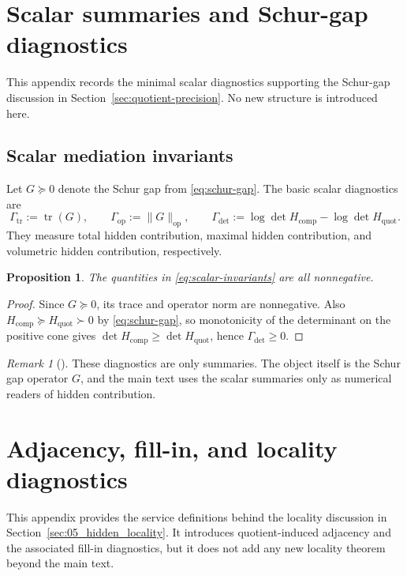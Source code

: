 \documentclass[11pt]{article}
\numberwithin{equation}{section}
\theoremstyle{thmcompact}
\newtheorem{proposition}[theorem]{Proposition}
\theoremstyle{remark}
\newtheorem*{remarkplain}{Remark}
\newenvironment{remark}[1][]%
{\begin{remarkbox}\begin{remarkplain}[#1]\normalfont}
		{\end{remarkplain}\end{remarkbox}}
\begin{document}
\section{Scalar summaries and Schur-gap diagnostics}\label{app:scalar}

This appendix records the minimal scalar diagnostics supporting the Schur-gap discussion in Section~\ref{sec:quotient-precision}. No new structure is introduced here.

\subsection{Scalar mediation invariants}

Let $G\succeq0$ denote the Schur gap from \eqref{eq:schur-gap}. The basic scalar diagnostics are
\begin{equation}\label{eq:scalar-invariants}
\Gamma_{\mathrm{tr}}:=\operatorname{tr}(G),
\qquad
\Gamma_{\mathrm{op}}:=\|G\|_{\mathrm{op}},
\qquad
\Gamma_{\det}:=\log\det H_{\mathrm{comp}}-\log\det H_{\mathrm{quot}}.
\end{equation}
They measure total hidden contribution, maximal hidden contribution, and volumetric hidden contribution, respectively.

\begin{proposition}\label{prop:scalar-invariants}
The quantities in \eqref{eq:scalar-invariants} are all nonnegative.
\end{proposition}

\begin{proof}
Since $G\succeq0$, its trace and operator norm are nonnegative. Also $H_{\mathrm{comp}}\succeq H_{\mathrm{quot}}\succ0$ by \eqref{eq:schur-gap}, so monotonicity of the determinant on the positive cone gives $\det H_{\mathrm{comp}}\ge \det H_{\mathrm{quot}}$, hence $\Gamma_{\det}\ge0$.
\end{proof}

\begin{remark}
These diagnostics are only summaries. The object itself is the Schur gap operator $G$, and the main text uses the scalar summaries only as numerical readers of hidden contribution.
\end{remark}

\section{Adjacency, fill-in, and locality diagnostics}\label{app:adjacency}

This appendix provides the service definitions behind the locality discussion in Section~\ref{sec:05_hidden_locality}. It introduces quotient-induced adjacency and the associated fill-in diagnostics, but it does not add any new locality theorem beyond the main text.
\end{document}
